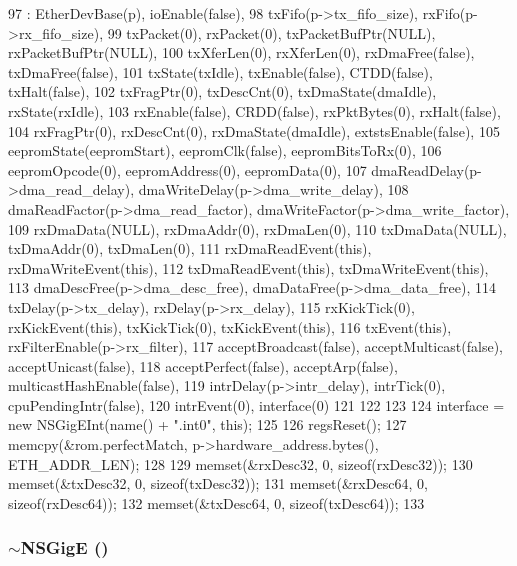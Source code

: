 \begin{DoxyCode}
97     : EtherDevBase(p), ioEnable(false),
98       txFifo(p->tx_fifo_size), rxFifo(p->rx_fifo_size),
99       txPacket(0), rxPacket(0), txPacketBufPtr(NULL), rxPacketBufPtr(NULL),
100       txXferLen(0), rxXferLen(0), rxDmaFree(false), txDmaFree(false),
101       txState(txIdle), txEnable(false), CTDD(false), txHalt(false),
102       txFragPtr(0), txDescCnt(0), txDmaState(dmaIdle), rxState(rxIdle),
103       rxEnable(false), CRDD(false), rxPktBytes(0), rxHalt(false),
104       rxFragPtr(0), rxDescCnt(0), rxDmaState(dmaIdle), extstsEnable(false),
105       eepromState(eepromStart), eepromClk(false), eepromBitsToRx(0),
106       eepromOpcode(0), eepromAddress(0), eepromData(0),
107       dmaReadDelay(p->dma_read_delay), dmaWriteDelay(p->dma_write_delay),
108       dmaReadFactor(p->dma_read_factor), dmaWriteFactor(p->dma_write_factor),
109       rxDmaData(NULL), rxDmaAddr(0), rxDmaLen(0),
110       txDmaData(NULL), txDmaAddr(0), txDmaLen(0),
111       rxDmaReadEvent(this), rxDmaWriteEvent(this),
112       txDmaReadEvent(this), txDmaWriteEvent(this),
113       dmaDescFree(p->dma_desc_free), dmaDataFree(p->dma_data_free),
114       txDelay(p->tx_delay), rxDelay(p->rx_delay),
115       rxKickTick(0), rxKickEvent(this), txKickTick(0), txKickEvent(this),
116       txEvent(this), rxFilterEnable(p->rx_filter),
117       acceptBroadcast(false), acceptMulticast(false), acceptUnicast(false),
118       acceptPerfect(false), acceptArp(false), multicastHashEnable(false),
119       intrDelay(p->intr_delay), intrTick(0), cpuPendingIntr(false),
120       intrEvent(0), interface(0)
121 {
122 
123 
124     interface = new NSGigEInt(name() + ".int0", this);
125 
126     regsReset();
127     memcpy(&rom.perfectMatch, p->hardware_address.bytes(), ETH_ADDR_LEN);
128 
129     memset(&rxDesc32, 0, sizeof(rxDesc32));
130     memset(&txDesc32, 0, sizeof(txDesc32));
131     memset(&rxDesc64, 0, sizeof(rxDesc64));
132     memset(&txDesc64, 0, sizeof(txDesc64));
133 }
\end{DoxyCode}
\hypertarget{classNSGigE_a57c257403a1ffa2375fb253ea11a82dc}{
\subsubsection[{$\sim$NSGigE}]{\setlength{\rightskip}{0pt plus 5cm}$\sim${\bf NSGigE} ()}}
\label{classNSGigE_a57c257403a1ffa2375fb253ea11a82dc}



